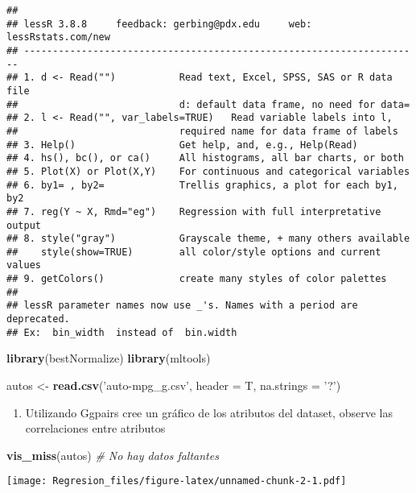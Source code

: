 \documentclass[]{article}
\newenvironment{Shaded}{\begin{snugshade}}{\end{snugshade}}
\newcommand{\CommentTok}[1]{\textcolor[rgb]{0.56,0.35,0.01}{\textit{#1}}}
\newcommand{\DataTypeTok}[1]{\textcolor[rgb]{0.13,0.29,0.53}{#1}}
\newcommand{\KeywordTok}[1]{\textcolor[rgb]{0.13,0.29,0.53}{\textbf{#1}}}
\newcommand{\NormalTok}[1]{#1}
\newcommand{\StringTok}[1]{\textcolor[rgb]{0.31,0.60,0.02}{#1}}
\providecommand{\tightlist}{%
  \setlength{\itemsep}{0pt}\setlength{\parskip}{0pt}}
\begin{document}
\begin{verbatim}
## 
## lessR 3.8.8     feedback: gerbing@pdx.edu     web: lessRstats.com/new
## ---------------------------------------------------------------------
## 1. d <- Read("")           Read text, Excel, SPSS, SAS or R data file
##                            d: default data frame, no need for data=
## 2. l <- Read("", var_labels=TRUE)   Read variable labels into l,
##                            required name for data frame of labels
## 3. Help()                  Get help, and, e.g., Help(Read)
## 4. hs(), bc(), or ca()     All histograms, all bar charts, or both
## 5. Plot(X) or Plot(X,Y)    For continuous and categorical variables
## 6. by1= , by2=             Trellis graphics, a plot for each by1, by2
## 7. reg(Y ~ X, Rmd="eg")    Regression with full interpretative output
## 8. style("gray")           Grayscale theme, + many others available
##    style(show=TRUE)        all color/style options and current values
## 9. getColors()             create many styles of color palettes
## 
## lessR parameter names now use _'s. Names with a period are deprecated.
## Ex:  bin_width  instead of  bin.width
\end{verbatim}

\begin{Shaded}
\begin{Highlighting}[]
\KeywordTok{library}\NormalTok{(bestNormalize)}
\KeywordTok{library}\NormalTok{(mltools)}

\NormalTok{autos <-}\StringTok{ }\KeywordTok{read.csv}\NormalTok{(}\StringTok{'auto-mpg_g.csv'}\NormalTok{, }\DataTypeTok{header =}\NormalTok{ T, }\DataTypeTok{na.strings =} \StringTok{'?'}\NormalTok{)}
\end{Highlighting}
\end{Shaded}

\begin{enumerate}
\def\labelenumi{\arabic{enumi}.}
\setcounter{enumi}{1}
\tightlist
\item
  Utilizando Ggpairs cree un gráfico de los atributos del dataset,
  observe las correlaciones entre atributos
\end{enumerate}

\begin{Shaded}
\begin{Highlighting}[]
\KeywordTok{vis_miss}\NormalTok{(autos) }\CommentTok{# No hay datos faltantes}
\end{Highlighting}
\end{Shaded}

\texttt{[image: Regresion\_files/figure-latex/unnamed-chunk-2-1.pdf]}
\end{document}
